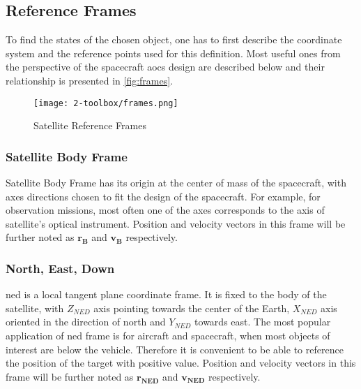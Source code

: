 

\clearpage
\subsection{Reference Frames}\label{sec:frames}
    To find the states of the chosen object, one has to first describe the coordinate system and the reference points used for this definition. Most useful ones from the perspective of the spacecraft \ac{aocs} design are described below and their relationship is presented in \autoref{fig:frames}.
    \vfill
    \begin{figure}[H]
        \centering
        \texttt{[image: 2-toolbox/frames.png]}
        \caption{Satellite Reference Frames\cite{6ecef-frames}}
        \label{fig:frames}
    \end{figure}
    \vfill
    \subsubsection{Satellite Body Frame}
        Satellite Body Frame has its origin at the center of mass of the spacecraft, with axes directions chosen to fit the design of the spacecraft. For example, for observation missions, most often one of the axes corresponds to the axis of satellite's optical instrument. Position and velocity vectors in this frame will be further noted as $\textbf{r}_\textbf{B}$ and $\textbf{v}_\textbf{B}$ respectively.

    \subsubsection{North, East, Down}
        \ac{ned} is a local tangent plane coordinate frame. It is fixed to the body of the satellite, with $Z_{NED}$ axis pointing towards the center of the Earth, $X_{NED}$ axis oriented in the direction of north and $Y_{NED}$ towards east. The most popular application of \ac{ned} frame is for aircraft and spacecraft, when most objects of interest are below the vehicle. Therefore it is convenient to be able to reference the position of the target with positive value. Position and velocity vectors in this frame will be further noted as $\textbf{r}_\textbf{NED}$ and $\textbf{v}_\textbf{NED}$ respectively.

